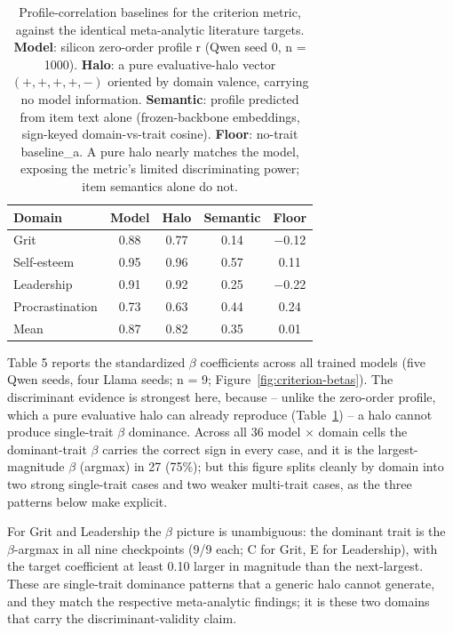 \documentclass[11pt]{article}
\begin{document}
\begin{table}[ht!]
\centering
\caption{Profile-correlation baselines for the criterion metric, against the identical meta-analytic literature targets. \textbf{Model}: silicon zero-order profile r (Qwen seed 0, n = 1000). \textbf{Halo}: a pure evaluative-halo vector $(+,+,+,+,-)$ oriented by domain valence, carrying no model information. \textbf{Semantic}: profile predicted from item text alone (frozen-backbone embeddings, sign-keyed domain-vs-trait cosine). \textbf{Floor}: no-trait baseline\_a. A pure halo nearly matches the model, exposing the metric's limited discriminating power; item semantics alone do not.}
\label{tab:criterion-baselines}
\begin{tabular}{lcccc}
\toprule
Domain & Model & Halo & Semantic & Floor \\
\midrule
Grit & 0.88 & 0.77 & 0.14 & $-$0.12 \\
Self-esteem & 0.95 & 0.96 & 0.57 & 0.11 \\
Leadership & 0.91 & 0.92 & 0.25 & $-$0.22 \\
Procrastination & 0.73 & 0.63 & 0.44 & 0.24 \\
\midrule
Mean & 0.87 & 0.82 & 0.35 & 0.01 \\
\bottomrule
\end{tabular}
\end{table}

Table 5 reports the standardized $\beta$ coefficients across all trained models (five Qwen seeds, four Llama seeds; n = 9; Figure~\ref{fig:criterion-betas}). The discriminant evidence is strongest here, because -- unlike the zero-order profile, which a pure evaluative halo can already reproduce (Table~\ref{tab:criterion-baselines}) -- a halo cannot produce single-trait $\beta$ dominance. Across all 36 model $\times$ domain cells the dominant-trait $\beta$ carries the correct sign in every case, and it is the largest-magnitude $\beta$ (argmax) in 27 (75\%); but this figure splits cleanly by domain into two strong single-trait cases and two weaker multi-trait cases, as the three patterns below make explicit.

For Grit and Leadership the $\beta$ picture is unambiguous: the dominant trait is the $\beta$-argmax in all nine checkpoints (9/9 each; C for Grit, E for Leadership), with the target coefficient at least 0.10 larger in magnitude than the next-largest. These are single-trait dominance patterns that a generic halo cannot generate, and they match the respective meta-analytic findings; it is these two domains that carry the discriminant-validity claim.
\end{document}

